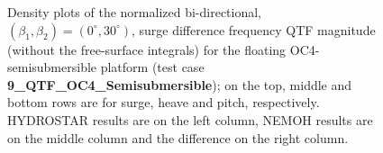 \documentclass[12pt,a4paper,titlepage]{article}
\begin{document}
\begin{itemize}
\begin{figure}[h!tbp]
	\centering
{}
	\caption{Density plots of the normalized bi-directional, $(\beta_1,\beta_2)=(0^{\circ},30^{\circ})$, surge difference frequency QTF magnitude (without the free-surface integrals) for the floating OC4-semisubmersible platform (test case \textbf{9\_QTF\_OC4\_Semisubmersible}); on the top, middle and bottom rows are for surge, heave and pitch, respectively. HYDROSTAR results are on the left column, NEMOH results are on the middle column and the difference on the right column.}\label{fig:QTFM_OC4}
\end{figure}


\end{itemize}
\end{document}
